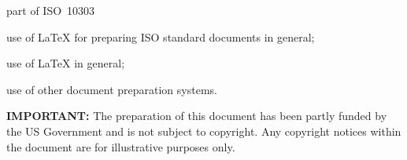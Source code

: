 \documentclass[wd,copyright,letterpaper]{isov2}
\newcommand{\latex}{LaTeX}
\begin{document}
\begin{outofscope}{part of ISO~10303}
\item use of \latex{} for preparing ISO standard documents in general;
\item use of \latex{} in general;
\item use of other document preparation systems.
\end{outofscope}

\textbf{IMPORTANT:} The preparation of this document has been partly
funded by the US Government and is not subject to copyright.
Any copyright notices within the document are for illustrative purposes only.

\normrefsclause \label{sec:nrefs}

\begin{nreferences}



\nrefparti

\nrefpartxi

\nrefpartxii

\nrefasni


\end{nreferences}

\end{document}
